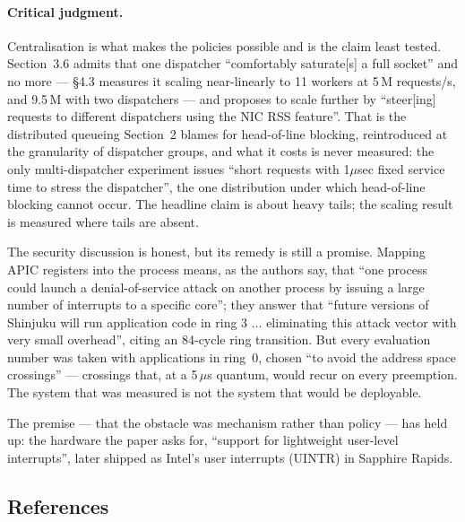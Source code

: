\paragraph{Critical judgment.}
Centralisation is what makes the policies possible and is the claim least tested.
Section~3.6 admits that one dispatcher ``comfortably saturate[s] a full socket'' and no
more --- \S4.3 measures it scaling near-linearly to 11 workers at 5\,M requests/s, and
9.5\,M with two dispatchers --- and proposes to scale further by ``steer[ing] requests to
different dispatchers using the NIC RSS feature''. That is the
distributed queueing Section~2 blames for head-of-line blocking, reintroduced at the
granularity of dispatcher groups, and what it costs is never measured: the only
multi-dispatcher experiment issues ``short requests with 1$\mu$sec fixed service time to
stress the dispatcher'', the one distribution under which head-of-line blocking cannot
occur. The headline claim is about heavy tails; the scaling result is measured where
tails are absent.

The security discussion is honest, but its remedy is still a promise. Mapping APIC
registers into the process means, as the authors say, that ``one process could launch a
denial-of-service attack on another process by issuing a large number of interrupts to a
specific core''; they answer that ``future versions of Shinjuku will run application
code in ring 3 $\ldots$ eliminating this attack vector with very small overhead'', citing
an 84-cycle ring transition. But every evaluation number was taken with applications in
ring~0, chosen ``to avoid the address space crossings'' --- crossings that, at a
5\,$\mu$s quantum, would recur on every preemption. The system that was measured is not
the system that would be deployable.

The premise --- that the obstacle was mechanism rather than policy --- has held up: the
hardware the paper asks for, ``support for lightweight user-level interrupts'', later
shipped as Intel's user interrupts (UINTR) in Sapphire Rapids.

\subsection*{References}

